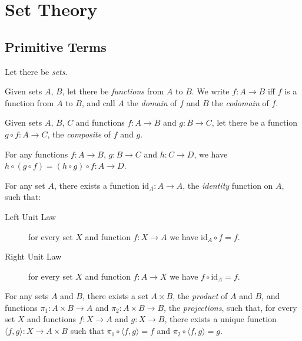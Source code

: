 \newcommand{\id}[1]{\ensuremath{\mathrm{id}_{#1}}}
\newcommand{\finsubseteq}{\ensuremath{\subseteq^{\mathrm{fin}}}}
\newcommand{\dom}{\ensuremath{\operatorname{dom}}}
\newcommand{\ran}{\ensuremath{\operatorname{ran}}}

\chapter{Set Theory}

\section{Primitive Terms}

Let there be \emph{sets}.

Given sets $A$, $B$, let there be \emph{functions} from $A$ to $B$.
We write $f : A \rightarrow B$ iff $f$ is a function from $A$ to $B$, and call $A$ the \emph{domain} of $f$ and $B$ the \emph{codomain} of $f$.

Given sets $A$, $B$, $C$ and functions $f : A \rightarrow B$ and $g : B \rightarrow C$, let there be a function $g \circ f : A \rightarrow C$, the \emph{composite} of $f$ and $g$.

\begin{ax}[Associativity]
For any functions $f : A \rightarrow B$, $g : B \rightarrow C$ and $h : C \rightarrow D$, we have $h \circ (g \circ f) = (h \circ g) \circ f : A \rightarrow D$.
\end{ax}

\begin{ax}
  For any set $A$, there exists a function $\id{A} : A \rightarrow A$, the \emph{identity} function on $A$, such that:
  \begin{description}
    \item[Left Unit Law]
    for every set $X$ and function $f : X \rightarrow A$ we have $\id{A} \circ f = f$.
    \item[Right Unit Law]
    for every set $X$ and function $f : A \rightarrow X$ we have $f \circ \id{A} = f$.
  \end{description}
\end{ax}

\begin{ax}[Product]
  For any sets $A$ and $B$, there exists a set $A \times B$, the \emph{product} of $A$ and $B$, and functions $\pi_1 : A \times B \rightarrow A$ and $\pi_2 : A \times B \rightarrow B$, the \emph{projections}, such that, for every set $X$ and functions $f : X \rightarrow A$ and $g : X \rightarrow B$, there exists a unique function $\langle f, g \rangle : X \rightarrow A \times B$ such that $\pi_1 \circ \langle f,g \rangle = f$ and $\pi_2 \circ \langle f,g \rangle = g$.
\end{ax}

